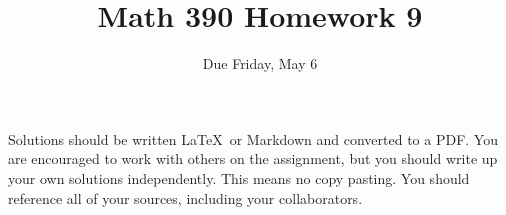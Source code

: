 \documentclass{article}
\title{Math 390 Homework 9}
\author{Due Friday, May 6}
\date{}
\begin{document}

\maketitle

\setlength{\parindent}{0em} %
\setlength{\parskip}{1em} %



Solutions should be written \LaTeX\ or Markdown and converted to a PDF. You are encouraged to work with others
on the assignment, but you should write up your own solutions independently. This means no copy pasting. You should
reference all of your sources, including your collaborators. 
\end{document}
